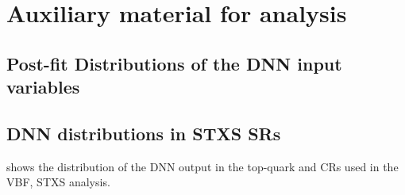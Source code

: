 \FloatBarrier
\chapter{Auxiliary material for \HWW analysis}


\FloatBarrier
\section{Post-fit Distributions of the DNN input variables}
\label{app:post-fit-distributions}


\FloatBarrier
\section{DNN distributions in STXS SRs}
 shows the distribution of the DNN output in the top-quark and \Ztautau CRs used in the VBF, STXS analysis. 

